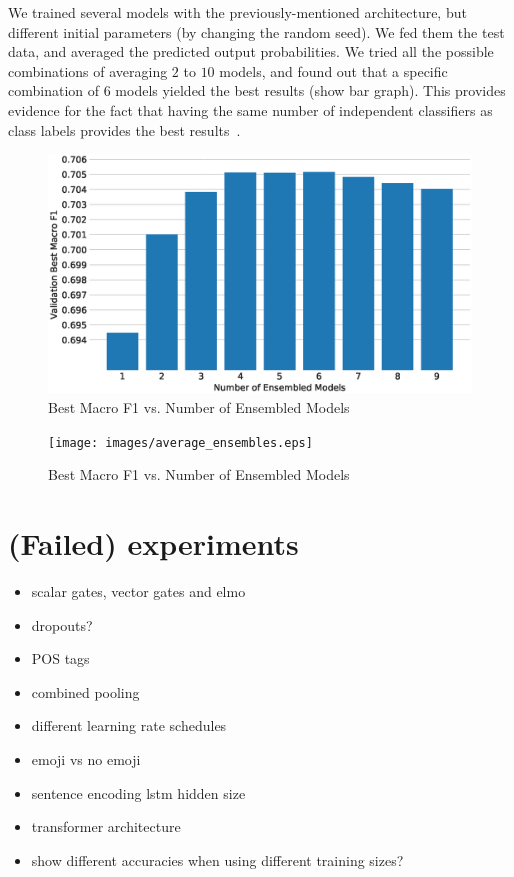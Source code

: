 \documentclass[11pt,a4paper]{article}
\begin{document}
We trained several models with the previously-mentioned architecture, but
different initial parameters (by changing the random seed). We fed them the test
data, and averaged the predicted output probabilities. We tried all the possible
combinations of averaging $2$ to $10$ models, and found out that a specific
combination of $6$ models yielded the best results (show bar graph). This
provides evidence for the fact that having the same number of independent
classifiers as class labels provides the best results~\cite{bonab2016theoretical}.

\begin{figure}
    \centering
    \includegraphics[width=\columnwidth]{images/best_ensembles.eps}
\caption{Best Macro F1 vs. Number of Ensembled Models}
\label{fig:}
\end{figure}

\begin{figure}
    \centering
    \texttt{[image: images/average\_ensembles.eps]}
\caption{Best Macro F1 vs. Number of Ensembled Models}
\label{fig:}
\end{figure}



\section{(Failed) experiments}
\begin{itemize}
    \item scalar gates, vector gates and elmo
    \item dropouts?
    \item POS tags
    \item combined pooling
    \item different learning rate schedules
    \item emoji vs no emoji
    \item sentence encoding lstm hidden size
    \item transformer architecture
    \item show different accuracies when using different training sizes?
\end{itemize}
\end{document}
